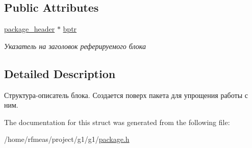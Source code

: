 \subsection*{Public Attributes}
\begin{DoxyCompactItemize}
\item 
\hyperlink{structg1_1_1package__header}{package\+\_\+header} $\ast$ \hyperlink{structg1_1_1package_a1e75b5ccd00f3b8bd3c7958bc6d957e9}{bptr}\hypertarget{structg1_1_1package_a1e75b5ccd00f3b8bd3c7958bc6d957e9}{}\label{structg1_1_1package_a1e75b5ccd00f3b8bd3c7958bc6d957e9}

\begin{DoxyCompactList}\small\item\em Указатель на заголовок реферируемого блока \end{DoxyCompactList}\end{DoxyCompactItemize}


\subsection{Detailed Description}
Структура-\/описатель блока. Создается поверх пакета для упрощения работы с ним. 

The documentation for this struct was generated from the following file\+:\begin{DoxyCompactItemize}
\item 
/home/rfmeas/project/g1/g1/\hyperlink{package_8h}{package.\+h}\end{DoxyCompactItemize}
